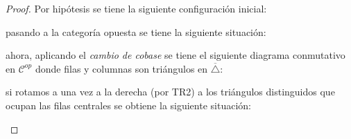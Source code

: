 \documentclass{article}
\newcommand{\cc}{\mathscr{C}}
\begin{document}
\begin{enumerate}
\begin{proof}
Por hipótesis se tiene la siguiente configuración inicial:

\begin{center}
\end{center}

pasando a la categoría opuesta se tiene la siguiente situación:

\begin{center}
\end{center}

ahora, aplicando el \emph{cambio de cobase} se tiene el siguiente diagrama conmutativo en $\cc^{op}$ donde filas y columnas son triángulos en $\overline{\triangle}$:

\begin{center}
\end{center}

si rotamos a una vez a la derecha (por TR2) a los triángulos distinguidos que ocupan las filas centrales se obtiene la siguiente situaci\'on:

\begin{center}
\end{center}


\end{proof}
\end{enumerate}
\end{document}
